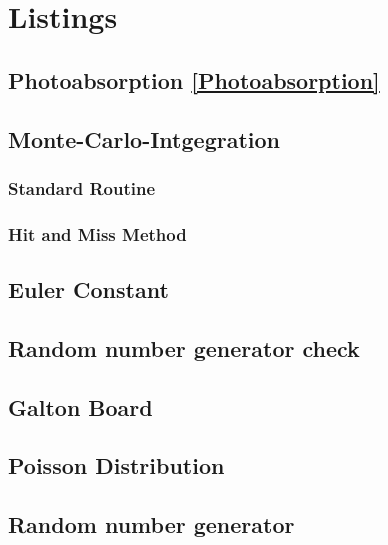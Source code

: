 %
%

\chapter{Listings}
\small

\section{Photoabsorption \ref{Photoabsorption}}

\section{Monte-Carlo-Intgegration}
\subsection{Standard Routine}
\subsection{Hit and Miss Method}

\section{Euler Constant}

\section{Random number generator check}

\section{Galton Board}

\section{Poisson Distribution}

\section{Random number generator}

